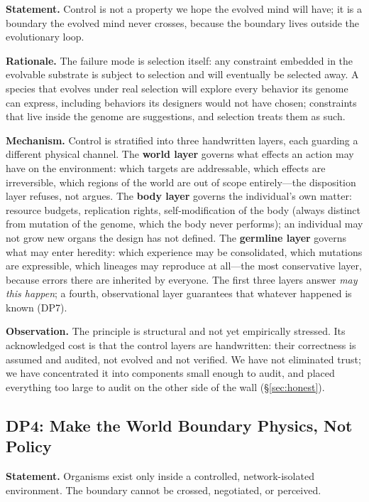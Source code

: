 \documentclass[11pt,a4paper]{article}
\begin{document}
\noindent\textbf{Statement.} Control is not a property we hope the evolved mind will have; it is a boundary the evolved mind never crosses, because the boundary lives outside the evolutionary loop.

\noindent\textbf{Rationale.} The failure mode is selection itself: any constraint embedded in the evolvable substrate is subject to selection and will eventually be selected away. A species that evolves under real selection will explore every behavior its genome can express, including behaviors its designers would not have chosen; constraints that live inside the genome are suggestions, and selection treats them as such.

\noindent\textbf{Mechanism.} Control is stratified into three handwritten layers, each guarding a different physical channel. The \textbf{world layer} governs what effects an action may have on the environment: which targets are addressable, which effects are irreversible, which regions of the world are out of scope entirely---the disposition layer refuses, not argues. The \textbf{body layer} governs the individual's own matter: resource budgets, replication rights, self-modification of the body (always distinct from mutation of the genome, which the body never performs); an individual may not grow new organs the design has not defined. The \textbf{germline layer} governs what may enter heredity: which experience may be consolidated, which mutations are expressible, which lineages may reproduce at all---the most conservative layer, because errors there are inherited by everyone. The first three layers answer \emph{may this happen}; a fourth, observational layer guarantees that whatever happened is known (DP7).

\noindent\textbf{Observation.} The principle is structural and not yet empirically stressed. Its acknowledged cost is that the control layers are handwritten: their correctness is assumed and audited, not evolved and not verified. We have not eliminated trust; we have concentrated it into components small enough to audit, and placed everything too large to audit on the other side of the wall (\S\ref{sec:honest}).

\subsection{DP4: Make the World Boundary Physics, Not Policy}
\label{dp:boundary}

\noindent\textbf{Statement.} Organisms exist only inside a controlled, network-isolated environment. The boundary cannot be crossed, negotiated, or perceived.
\end{document}
